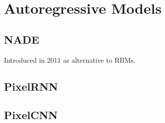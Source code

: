 \section{Autoregressive Models} 

\subsection{NADE}

Introduced in 2011 as alternative to RBMs. 

\subsection{PixelRNN} 


\subsection{PixelCNN}  


